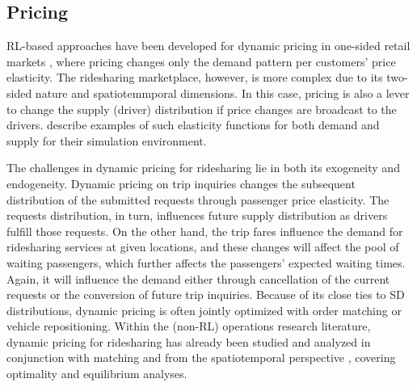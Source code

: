 \documentclass{article}
\newcommand{\tq}[1]{\textcolor{red}{#1}}
\begin{document}
\subsection{Pricing}\label{sec:pricing}
RL-based approaches have been developed for dynamic pricing in one-sided retail markets \citep{raju2003reinforcement,bertsimas2006dynamic}, where pricing changes only the demand pattern per customers' price elasticity. The ridesharing marketplace, however, is more complex due to its two-sided nature and spatiotemmporal dimensions. In this case, pricing is also a lever to change the supply (driver) distribution if price changes are broadcast to the drivers. \cite{chen2021spatial} describe examples of such elasticity functions for both demand and supply for their simulation environment.  

The challenges in dynamic pricing for ridesharing lie in both its exogeneity and endogeneity. Dynamic pricing on trip inquiries changes the subsequent distribution of the submitted requests through passenger price elasticity. The requests distribution, in turn, influences future supply distribution as drivers fulfill those requests. On the other hand, the trip fares influence the demand for ridesharing services at given locations, and these changes will affect the pool of waiting passengers, which further affects the passengers' expected waiting times. Again, it will influence the demand either through cancellation of the current requests or the conversion of future trip inquiries.
Because of its close ties to SD distributions, dynamic pricing is often jointly optimized with order matching or vehicle repositioning.  Within the (non-RL) operations research literature, dynamic pricing for ridesharing has already been studied and analyzed in conjunction with matching \citep{yan2020dynamic,ozkan2017dynamic} and from the spatiotemporal perspective \citep{ma2020spatio,bimpikis2019spatial,hu2021surge}, covering optimality and equilibrium analyses.
\end{document}
